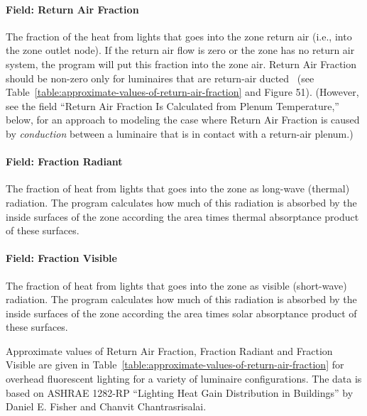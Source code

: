 \paragraph{Field: Return Air Fraction}\label{field-return-air-fraction}

The fraction of the heat from lights that goes into the zone return air (i.e., into the zone outlet node). If the return air flow is zero or the zone has no return air system, the program will put this fraction into the zone air. Return Air Fraction should be non-zero only for luminaires that are return-air ducted~ (see Table~\ref{table:approximate-values-of-return-air-fraction} and Figure 51). (However, see the field ``Return Air Fraction Is Calculated from Plenum Temperature,'' below, for an approach to modeling the case where Return Air Fraction is caused by \emph{conduction} between a luminaire that is in contact with a return-air plenum.)

\paragraph{Field: Fraction Radiant}\label{field-fraction-radiant-1}

The fraction of heat from lights that goes into the zone as long-wave (thermal) radiation. The program calculates how much of this radiation is absorbed by the inside surfaces of the zone according the area times thermal absorptance product of these surfaces.

\paragraph{Field: Fraction Visible}\label{field-fraction-visible}

The fraction of heat from lights that goes into the zone as visible (short-wave) radiation. The program calculates how much of this radiation is absorbed by the inside surfaces of the zone according the area times solar absorptance product of these surfaces.

Approximate values of Return Air Fraction, Fraction Radiant and Fraction Visible are given in Table~\ref{table:approximate-values-of-return-air-fraction} for overhead fluorescent lighting for a variety of luminaire configurations. The data is based on ASHRAE 1282-RP ``Lighting Heat Gain Distribution in Buildings'' by Daniel E. Fisher and Chanvit Chantrasrisalai.

